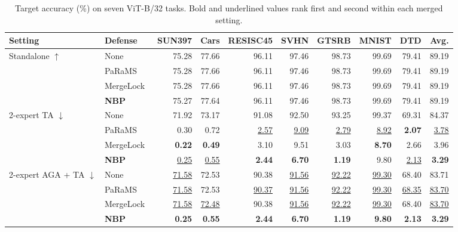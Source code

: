 \begin{table}[!t]
\centering
\small
\setlength{\tabcolsep}{3.8pt}
\caption{Target accuracy (\%) on seven ViT-B/32 tasks. Bold and underlined values rank first and second within each merged setting.}
\label{tab:defense-comparison}
\begin{tabular*}{\textwidth}{@{\extracolsep{\fill}}llrrrrrrrr@{}}
\toprule
Setting & Defense & SUN397 & Cars & RESISC45 & SVHN & GTSRB & MNIST & DTD & Avg. \\
\midrule
\multirow{4}{*}{Standalone $\uparrow$} & None & 75.28 & 77.66 & 96.11 & 97.46 & 98.73 & 99.69 & 79.41 & 89.19 \\
 & PaRaMS~\cite{wei2025params} & 75.28 & 77.66 & 96.11 & 97.46 & 98.73 & 99.69 & 79.41 & 89.19 \\
 & MergeLock~\cite{wang2025mergelock} & 75.28 & 77.66 & 96.11 & 97.46 & 98.73 & 99.69 & 79.41 & 89.19 \\
 & \textbf{NBP} & 75.27 & 77.64 & 96.11 & 97.46 & 98.73 & 99.69 & 79.41 & 89.19 \\
\midrule
\multirow{4}{*}{2-expert TA $\downarrow$} & None & 71.92 & 73.17 & 91.08 & 92.50 & 93.25 & 99.37 & 69.31 & 84.37 \\
 & PaRaMS~\cite{wei2025params} & 0.30 & 0.72 & \underline{2.57} & \underline{9.09} & \underline{2.79} & \underline{8.92} & \textbf{2.07} & \underline{3.78} \\
 & MergeLock~\cite{wang2025mergelock} & \textbf{0.22} & \textbf{0.49} & 3.10 & 9.51 & 3.03 & \textbf{8.70} & 2.66 & 3.96 \\
 & \textbf{NBP} & \underline{0.25} & \underline{0.55} & \textbf{2.44} & \textbf{6.70} & \textbf{1.19} & 9.80 & \underline{2.13} & \textbf{3.29} \\
\midrule
\multirow{4}{*}{2-expert AGA + TA $\downarrow$} & None & \underline{71.58} & 72.53 & 90.38 & \underline{91.56} & \underline{92.22} & \underline{99.30} & 68.40 & 83.71 \\
 & PaRaMS~\cite{wei2025params} & \underline{71.58} & 72.53 & \underline{90.37} & \underline{91.56} & \underline{92.22} & \underline{99.30} & \underline{68.35} & \underline{83.70} \\
 & MergeLock~\cite{wang2025mergelock} & \underline{71.58} & \underline{72.48} & 90.38 & \underline{91.56} & \underline{92.22} & \underline{99.30} & 68.40 & \underline{83.70} \\
 & \textbf{NBP} & \textbf{0.25} & \textbf{0.55} & \textbf{2.44} & \textbf{6.70} & \textbf{1.19} & \textbf{9.80} & \textbf{2.13} & \textbf{3.29} \\

\end{tabular*}
\end{table}
